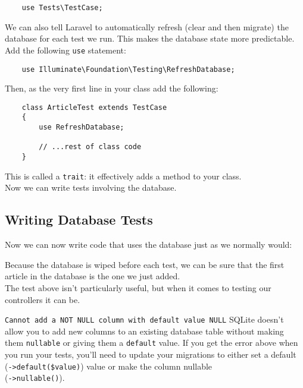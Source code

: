 \begin{verbatim}
    use Tests\TestCase;
\end{verbatim}

We can also tell Laravel to automatically refresh (clear and then migrate) the database for each test we run. This makes the database state more predictable.
\\

Add the following \texttt{use} statement:

\begin{verbatim}
    use Illuminate\Foundation\Testing\RefreshDatabase;
\end{verbatim}

Then, as the very first line in your class add the following:

\begin{verbatim}
    class ArticleTest extends TestCase
    {
        use RefreshDatabase;

        // ...rest of class code
    }
\end{verbatim}

This is called a \texttt{trait}: it effectively adds a method to your class.
\\

Now we can write tests involving the database.

\subsection{Writing Database Tests}

Now we can now write code that uses the database just as we normally would:


Because the database is wiped before each test, we can be sure that the first article in the database is the one we just added.
\\

The test above isn't particularly useful, but when it comes to testing our controllers it can be.

\begin{infobox}{\texttt{Cannot add a NOT NULL column with default value NULL}}
    SQLite doesn't allow you to add new columns to an existing database table without making them \texttt{nullable} or giving them a \texttt{default} value. If you get the error above when you run your tests, you'll need to update your migrations to either set a default (\texttt{->default(\$value)}) value or make the column nullable \\ (\texttt{->nullable()}).
\end{infobox}




